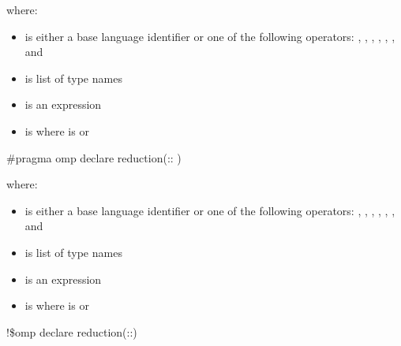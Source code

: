 where:

\begin{itemize}

\item {} is either a base language identifier or one of the following 
operators: 
\code{+}, 
\code{-}, 
\code{*}, 
\code{\&}, 
\code{|}, 
\code{\^}, 
\code{\&\&} and 
\code{||} 

\item {} is list of type names 

\item {} is an expression 

\item {} is \code{)}
where  is\linebreak
{} or \code{(}\code{)} 
\end{itemize}
\cspecificend


\cppspecificstart
\begin{boxedcode}
\#pragma omp declare reduction(:: 
)
\end{boxedcode}

where:

\begin{itemize}
\item {} is either a base language identifier or one of the following 
operators: 
\code{+}, 
\code{-}, 
\code{*}, 
\code{\&}, 
\code{|}, 
\code{\^}, 
\code{\&\&} and 
\code{||} 

\item {} is list of type names 

\item {} is an expression 

\item {} is \code{)} 
where  is\linebreak
{}  or \code{(}\code{)} 
\end{itemize}
\cppspecificend


\fortranspecificstart
\begin{boxedcode}
!\$omp declare reduction(::) 
\end{boxedcode}

